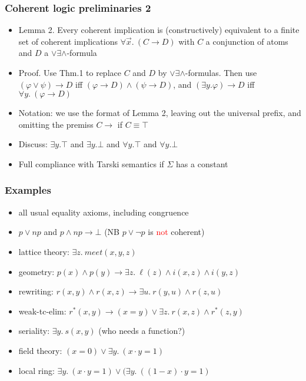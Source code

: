 \documentclass[handout,11pt]{beamer}
\newcommand{\red}[1]{\textcolor{red}{#1}}
\newcommand{\deca}{${\lor}{\exists}{\land}$}
\begin{document}
\begin{frame}
\frametitle{Coherent logic preliminaries 2}
 \begin{itemize}[<+->]   %
    \item Lemma 2. Every coherent implication is (constructively) 
    equivalent to a finite set of coherent implications
    $\forall\vec{x}.~(C \to D)$ 
    with $C$ a conjunction of atoms and $D$ a \deca-formula
    \item Proof. Use Thm.1 to replace $C$ and $D$ by \deca-formulas.
    Then use $(\varphi\lor\psi)\to D$ iff $(\varphi\to D)\land(\psi\to D)$,
    and $(\exists y.\varphi)\to D$ iff $\forall y.~(\varphi\to D)$
    \item Notation: we use the format of Lemma 2, 
    leaving out the universal prefix, and omitting the premiss $C\to{}$ 
    if $C\equiv\top$
    \item Discuss: $\exists y.\top$ and $\exists y.\bot$ and
    $\forall y.\top$ and $\forall y.\bot$
    \item Full compliance with Tarski semantics if $\Sigma$ has a constant
 \end{itemize}
\end{frame}

\begin{frame}
\frametitle{Examples}
 \begin{itemize}[<+->]   %
    \item all usual equality axioms, including congruence
    \item $p\lor np$ and $p\land np\to\bot$ 
    (NB $p\lor\neg p$ is \red{not} coherent)
    \item lattice theory: $%
    \exists z.~\mathit{meet}(x,y,z)$
    \item geometry: $%
    p(x)\land p(y) \to \exists z.~\ell(z) \land i(x,z) \land i(y,z)$
    \item rewriting: $%
    r(x,y)\land r(x,z) \to \exists u.~r(y,u)\land r(z,u)$
    \item weak-tc-elim: $%
    r^*(x,y)\to (x=y)\lor\exists z.~r(x,z)\land r^*(z,y)$     
    \item seriality: $%
    \exists y.~s(x,y)$ (who needs a function?)
    \item field theory: $%
    (x=0) \lor \exists y.~(x\cdot y=1)$
    \item local ring: 
    $\exists y.~(x\cdot y = 1) \lor (\exists y.~((1-x)\cdot y = 1)$
 \end{itemize}
\end{frame}
\end{document}
